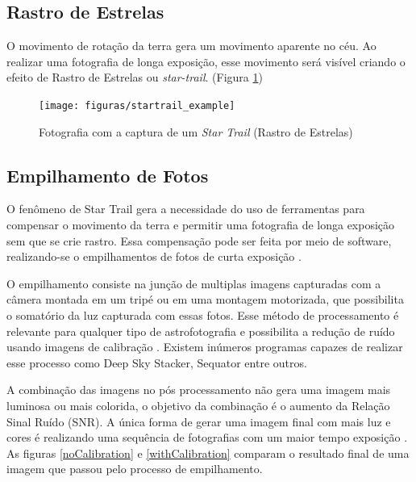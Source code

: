 \subsection{Rastro de Estrelas}

O movimento de rotação da terra gera um movimento aparente no céu. Ao realizar uma fotografia de longa exposição, esse movimento será visível criando o efeito de Rastro de Estrelas ou \textit{star-trail}. (Figura \ref{fig:startrail_example})

\begin{figure}[!htb]
	\centering
	\caption{Fotografia com a captura de um \textit{Star Trail} (Rastro de Estrelas)}
	\texttt{[image: figuras/startrail\_example]}
	\label{fig:startrail_example}
\end{figure}

\subsection{Empilhamento de Fotos}

O fenômeno de Star Trail gera a necessidade do uso de ferramentas para compensar o movimento da terra e permitir uma fotografia de longa exposição sem que se crie rastro. Essa compensação pode ser feita por meio de software, realizando-se o empilhamentos de fotos de curta exposição \cite{livro:astropratica}.

O empilhamento consiste na junção de multiplas imagens capturadas com a câmera montada em um tripé ou em uma montagem motorizada, que possibilita o somatório da luz capturada com essas fotos. Esse método de processamento é relevante para qualquer tipo de astrofotografia e possibilita a redução de ruído usando imagens de calibração \cite{book:bbcsky}. Existem inúmeros programas capazes de realizar esse processo como Deep Sky Stacker, Sequator entre outros.

A combinação das imagens no pós processamento não gera uma imagem mais luminosa ou mais colorida, o objetivo da combinação é o aumento da Relação Sinal Ruído (SNR). A única forma de gerar uma imagem final com mais luz e cores é realizando uma sequência de fotografias com um maior tempo exposição \cite{man:deepskystackerBetterImages}. As figuras \ref{noCalibration} e \ref{withCalibration} comparam o resultado final de uma imagem que passou pelo processo de empilhamento. 

